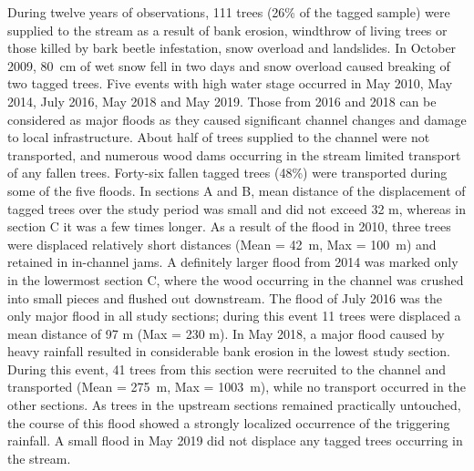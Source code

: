 {During twelve years of observations, 111 trees (26\% of the tagged sample) were supplied to the stream as a result of bank erosion, windthrow of living trees or those killed by bark beetle infestation, snow overload and landslides. In October 2009, 80~cm of wet snow fell in two days and snow overload caused breaking of two tagged trees. Five events with high water stage occurred in May 2010, May 2014, July 2016, May 2018 and May 2019. Those from 2016 and 2018 can be considered as major floods as they caused significant channel changes and damage to local infrastructure. About half of trees supplied to the channel were not transported, and numerous wood dams occurring in the stream limited transport of any fallen trees. Forty-six fallen tagged trees (48\%) were transported during some of the five floods. In sections A and B, mean distance of the displacement of tagged trees over the study period was small and did not exceed 32 m, whereas in section C it was a few times longer. As a result of the flood in 2010, three trees were displaced relatively short distances (Mean = 42~m, Max = 100~m) and retained in in-channel jams. A definitely larger flood from 2014 was marked only in the lowermost section C, where the wood occurring in the channel was crushed into small pieces and flushed out downstream. The flood of July 2016 was the only major flood in all study sections; during this event 11 trees were displaced a mean distance of 97 m (Max = 230 m). In May 2018, a major flood caused by heavy rainfall resulted in considerable bank erosion in the lowest study section. During this event, 41 trees from this section were recruited to the channel and transported (Mean = 275~m, Max = 1003~m), while no transport occurred in the other sections. As trees in the upstream sections remained practically untouched, the course of this flood showed a strongly localized occurrence of the triggering rainfall. A small flood in May 2019 did not displace any tagged trees occurring in the stream. 

}

